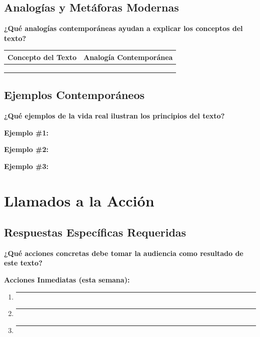 \documentclass[11pt,a4paper]{article}
\begin{document}
\subsection{Analogías y Metáforas Modernas}

\textbf{¿Qué analogías contemporáneas ayudan a explicar los conceptos del texto?}

\begin{tabularx}{\textwidth}{|X|X|}
\hline
\textbf{Concepto del Texto} & \textbf{Analogía Contemporánea} \\
\hline
& \\[2cm]
\hline
& \\[2cm]
\hline
& \\[2cm]
\hline
\end{tabularx}

\subsection{Ejemplos Contemporáneos}

\textbf{¿Qué ejemplos de la vida real ilustran los principios del texto?}

\textbf{Ejemplo \#1:}
\vspace{2cm}

\textbf{Ejemplo \#2:}
\vspace{2cm}

\textbf{Ejemplo \#3:}
\vspace{2cm}

\newpage

\section{Llamados a la Acción}

\subsection{Respuestas Específicas Requeridas}

\begin{practicalbox}
\textbf{¿Qué acciones concretas debe tomar la audiencia como resultado de este texto?}
\end{practicalbox}

\textbf{Acciones Inmediatas (esta semana):}
\begin{enumerate}[leftmargin=1cm]
    \item \rule{12cm}{0.4pt}
    \item \rule{12cm}{0.4pt}
    \item \rule{12cm}{0.4pt}
\end{enumerate}
\end{document}
